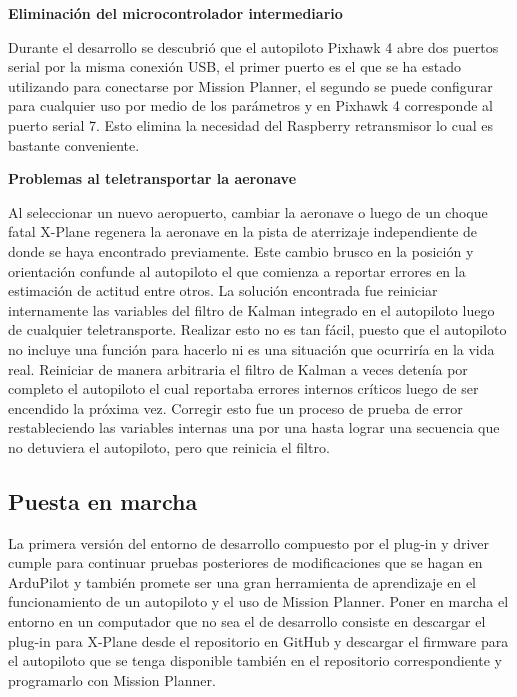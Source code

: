 \textbf{Eliminación del microcontrolador intermediario}

Durante el desarrollo se descubrió que el autopiloto Pixhawk 4 abre dos puertos serial por la misma conexión USB, el primer puerto es el que se ha estado utilizando para conectarse por Mission Planner, el segundo se puede configurar para cualquier uso por medio de los parámetros y en Pixhawk 4 corresponde al puerto serial 7. Esto elimina la necesidad del Raspberry retransmisor lo cual es bastante conveniente.

\textbf{Problemas al teletransportar la aeronave}

Al seleccionar un nuevo aeropuerto, cambiar la aeronave o luego de un choque fatal X-Plane regenera la aeronave en la pista de aterrizaje independiente de donde se haya encontrado previamente. Este cambio brusco en la posición y orientación confunde al autopiloto el que comienza a reportar errores en la estimación de actitud entre otros. La solución encontrada fue reiniciar internamente las variables del filtro de Kalman integrado en el autopiloto luego de cualquier teletransporte. Realizar esto no es tan fácil, puesto que el autopiloto no incluye una función para hacerlo ni es una situación que ocurriría en la vida real. Reiniciar de manera arbitraria el filtro de Kalman a veces detenía por completo el autopiloto el cual reportaba errores internos críticos luego de ser encendido la próxima vez. Corregir esto fue un proceso de prueba de error restableciendo las variables internas una por una hasta lograr una secuencia que no detuviera el autopiloto, pero que reinicia el filtro.

\subsection{Puesta en marcha}

La primera versión del entorno de desarrollo compuesto por el plug-in y driver cumple para continuar pruebas posteriores de modificaciones que se hagan en ArduPilot y también promete ser una gran herramienta de aprendizaje en el funcionamiento de un autopiloto y el uso de Mission Planner. Poner en marcha el entorno en un computador que no sea el de desarrollo consiste en descargar el plug-in para X-Plane desde el repositorio en GitHub \cite{xplane-hitl-plugin} y descargar el firmware para el autopiloto que se tenga disponible también en el repositorio correspondiente \cite{ap-hitl-fork} y programarlo con Mission Planner.
